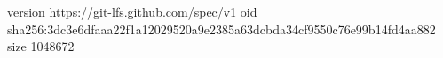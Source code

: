 version https://git-lfs.github.com/spec/v1
oid sha256:3dc3e6dfaaa22f1a12029520a9e2385a63dcbda34cf9550c76e99b14fd4aa882
size 1048672
